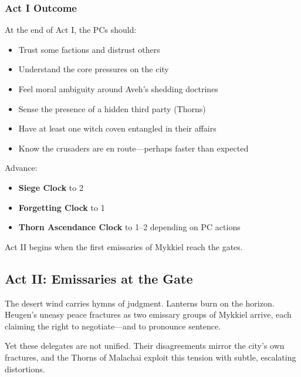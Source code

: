 \documentclass[11pt]{book}
\begin{document}
\vspace{1em}

\subsubsection*{Act I Outcome}

At the end of Act I, the PCs should:
\begin{itemize}[leftmargin=*]
    \item Trust some factions and distrust others
    \item Understand the core pressures on the city
    \item Feel moral ambiguity around Aveh's shedding doctrines
    \item Sense the presence of a hidden third party (Thorns)
    \item Have at least one witch coven entangled in their affairs
    \item Know the crusaders are en route---perhaps faster than expected
\end{itemize}

Advance:
\begin{itemize}
    \item \textbf{Siege Clock} to 2  
    \item \textbf{Forgetting Clock} to 1  
    \item \textbf{Thorn Ascendance Clock} to 1--2 depending on PC actions
\end{itemize}

Act II begins when the first emissaries of Mykkiel reach the gates.

\subsection{Act II: Emissaries at the Gate}

The desert wind carries hymns of judgment.  
Lanterns burn on the horizon.  
Heugen's uneasy peace fractures as two emissary groups of Mykkiel arrive,
each claiming the right to negotiate---and to pronounce sentence.

Yet these delegates are not unified. Their disagreements mirror the city's
own fractures, and the Thorns of Malachai exploit this tension with subtle,
escalating distortions.
\end{document}
